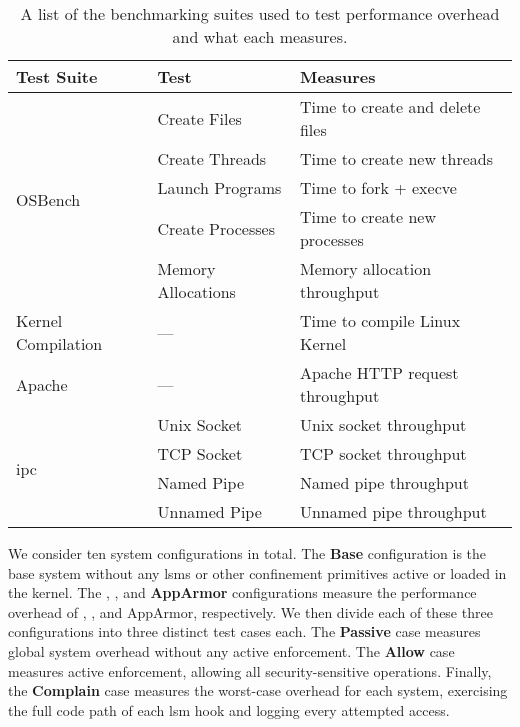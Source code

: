 \begin{table}[htpb]
  \centering
  \caption[List of benchmarking suites and what they measure]{
    A list of the benchmarking suites used to test performance overhead and what each
    measures.
  }%
  \label{tab:suites}
  \begin{tabular}{llp{3in}}
  \toprule
  Test Suite & Test & Measures \\
  \midrule
  \multirow{5}{*}{OSBench}   & Create Files       & Time to create and delete files \\
                             & Create Threads     & Time to create new threads \\
                             & Launch Programs    & Time to fork + execve \\
                             & Create Processes   & Time to create new processes \\
                             & Memory Allocations & Memory allocation throughput \\
  Kernel Compilation         & ---                & Time to compile Linux Kernel \\
  Apache                     & ---                & Apache HTTP request throughput \\
  \multirow{4}{*}{\gls{ipc}} & Unix Socket        & Unix socket throughput \\
                             & TCP Socket         & TCP socket throughput  \\
                             & Named Pipe         & Named pipe throughput  \\
                             & Unnamed Pipe       & Unnamed pipe throughput \\
  \bottomrule
  \end{tabular}
\end{table}

We consider ten system configurations in total. The \textbf{Base} configuration is the
base system without any \glspl{lsm} or other confinement primitives active or loaded in
the kernel. The \textbf{\bpfbox}, \textbf{\bpfcontain}, and \textbf{AppArmor}
configurations measure the performance overhead of \bpfbox{}, \bpfcontain{}, and AppArmor,
respectively. We then divide each of these three configurations into three distinct
test cases each. The \textbf{Passive} case measures global system overhead
without any active enforcement. The \textbf{Allow} case measures active
enforcement, allowing all security-sensitive operations. Finally, the \textbf{Complain}
case measures the worst-case overhead for each system, exercising the full code
path of each \gls{lsm} hook and logging every attempted access.

